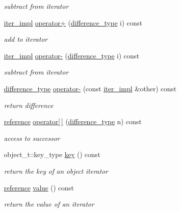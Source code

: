 \begin{DoxyCompactItemize}
\begin{DoxyCompactList}\small\item\em subtract from iterator \end{DoxyCompactList}\item 
\hyperlink{classnlohmann_1_1detail_1_1iter__impl}{iter\+\_\+impl} \hyperlink{classnlohmann_1_1detail_1_1iter__impl_a8ef76aeb5a5032768f0f61f48ac189c0}{operator+} (\hyperlink{classnlohmann_1_1detail_1_1iter__impl_a2f7ea9f7022850809c60fc3263775840}{difference\+\_\+type} i) const
\begin{DoxyCompactList}\small\item\em add to iterator \end{DoxyCompactList}\item 
\hyperlink{classnlohmann_1_1detail_1_1iter__impl}{iter\+\_\+impl} \hyperlink{classnlohmann_1_1detail_1_1iter__impl_a0dd9c415b94a02ff2aa25da75e52da30}{operator-\/} (\hyperlink{classnlohmann_1_1detail_1_1iter__impl_a2f7ea9f7022850809c60fc3263775840}{difference\+\_\+type} i) const
\begin{DoxyCompactList}\small\item\em subtract from iterator \end{DoxyCompactList}\item 
\hyperlink{classnlohmann_1_1detail_1_1iter__impl_a2f7ea9f7022850809c60fc3263775840}{difference\+\_\+type} \hyperlink{classnlohmann_1_1detail_1_1iter__impl_a49bf3e708a9c1c88c415011735962d06}{operator-\/} (const \hyperlink{classnlohmann_1_1detail_1_1iter__impl}{iter\+\_\+impl} \&other) const
\begin{DoxyCompactList}\small\item\em return difference \end{DoxyCompactList}\item 
\hyperlink{classnlohmann_1_1detail_1_1iter__impl_a5be8001be099c6b82310f4d387b953ce}{reference} \hyperlink{classnlohmann_1_1detail_1_1iter__impl_ac0b9276f1102ed4b9cd3f5f56287e3ce}{operator\mbox{[}$\,$\mbox{]}} (\hyperlink{classnlohmann_1_1detail_1_1iter__impl_a2f7ea9f7022850809c60fc3263775840}{difference\+\_\+type} n) const
\begin{DoxyCompactList}\small\item\em access to successor \end{DoxyCompactList}\item 
object\+\_\+t\+::key\+\_\+type \hyperlink{classnlohmann_1_1detail_1_1iter__impl_a3a541a223320f6635f2f188ba54f8818}{key} () const
\begin{DoxyCompactList}\small\item\em return the key of an object iterator \end{DoxyCompactList}\item 
\hyperlink{classnlohmann_1_1detail_1_1iter__impl_a5be8001be099c6b82310f4d387b953ce}{reference} \hyperlink{classnlohmann_1_1detail_1_1iter__impl_ab447c50354c6611fa2ae0100ac17845c}{value} () const
\begin{DoxyCompactList}\small\item\em return the value of an iterator \end{DoxyCompactList}\end{DoxyCompactItemize}
